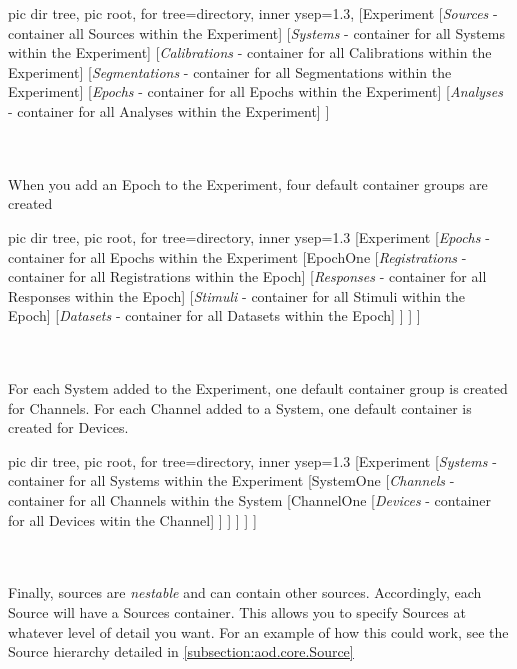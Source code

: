 \documentclass[10pt]{exam}
\newcommand\myurl[1]{\textcolor{blue}{\underline{#1}}}
\begin{document}
		\begin{forest}
			pic dir tree,
			pic root,
			for tree={directory, inner ysep=1.3},
			[Experiment
				[\textit{Sources} - container all Sources within the Experiment]
				[\textit{Systems} - container for all Systems within the Experiment]
				[\textit{Calibrations} - container for all Calibrations within the Experiment]
				[\textit{Segmentations} - container for all Segmentations within the Experiment]
				[\textit{Epochs} - container for all Epochs within the Experiment]
				[\textit{Analyses} - container for all Analyses within the Experiment]
			]
		\end{forest}
		\\$\quad$\\
		\noindent When you add an Epoch to the Experiment, four default container groups are created
		
		\begin{forest}
			pic dir tree, 
			pic root,
			for tree={directory, inner ysep=1.3}
			[Experiment
				[\textit{Epochs} - container for all Epochs within the Experiment
					[EpochOne
						[\textit{Registrations} - container for all Registrations within the Epoch]
						[\textit{Responses} - container for all Responses within the Epoch]
						[\textit{Stimuli} - container for all Stimuli within the Epoch]
						[\textit{Datasets} - container for all Datasets within the Epoch]
					]
				]
			]
		\end{forest}
		\\$\quad$\\
		For each System added to the Experiment, one default container group is created for Channels. For each Channel added to a System, one default container is created for Devices.
				
		\begin{forest}
		pic dir tree, 
		pic root,
		for tree={directory, inner ysep=1.3}
		[Experiment
			[\textit{Systems} - container for all Systems within the Experiment
				[SystemOne
					[\textit{Channels} - container for all Channels within the System
						[ChannelOne
							[\textit{Devices} - container for all Devices witin the Channel]
						]
					]
				]
			]
		]
		\end{forest}
	\\$\quad$\\
	\noindent Finally, sources are \textit{nestable} and can contain other sources. Accordingly, each Source will have a Sources container. This allows you to specify Sources at whatever level of detail you want. For an example of how this could work, see the Source hierarchy detailed in \myurl{\ref{subsection:aod.core.Source}}
	
\end{document}

